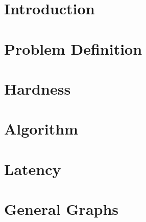 \begin{abstract}

\end{abstract}

\section{Introduction}


\section{Problem Definition}


\section{Hardness}


\section{Algorithm}


\section{Latency}


\section{General Graphs}

